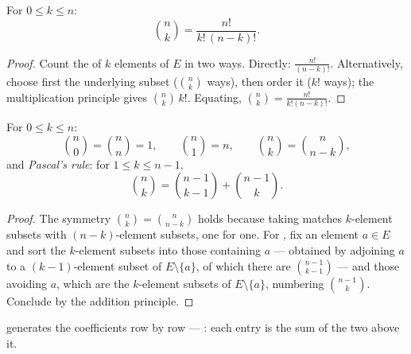 \begin{theorem}\label{thm:g12:comb:binomformula}
For $0 \leq k \leq n$:
\[
\binom{n}{k} = \frac{n!}{k!\,(n-k)!} .
\]
\end{theorem}

\begin{proof}
Count the  of $k$ elements of $E$ in two ways. Directly:
$\frac{n!}{(n-k)!}$. Alternatively, choose first the underlying subset
($\binom nk$ ways), then order it ($k!$ ways); the multiplication principle
gives $\binom{n}{k}\,k!$. Equating,
$\binom nk = \frac{n!}{k!(n-k)!}$.
\end{proof}

\begin{proposition}\label{prop:g12:comb:identities}
For $0 \leq k \leq n$:
\[
\binom{n}{0} = \binom{n}{n} = 1, \qquad
\binom{n}{1} = n, \qquad
\binom{n}{k} = \binom{n}{n-k},
\]
and \emph{Pascal's rule}: for $1 \leq k \leq n-1$,
\[
\binom{n}{k} = \binom{n-1}{k-1} + \binom{n-1}{k}.
\]
\end{proposition}

\begin{proof}
The symmetry $\binom nk = \binom{n}{n-k}$ holds because taking 
matches $k$-element subsets with $(n-k)$-element subsets, one for one. For
, fix an element $a \in E$ and sort the $k$-element subsets into
those containing $a$ --- obtained by adjoining $a$ to a $(k-1)$-element
subset of $E \setminus \{a\}$, of which there are $\binom{n-1}{k-1}$ --- and
those avoiding $a$, which are the $k$-element subsets of
$E \setminus \{a\}$, numbering $\binom{n-1}{k}$. Conclude by the addition
principle.
\end{proof}

 generates the coefficients row by row --- \emph{}: each entry is the sum of the two above it.


